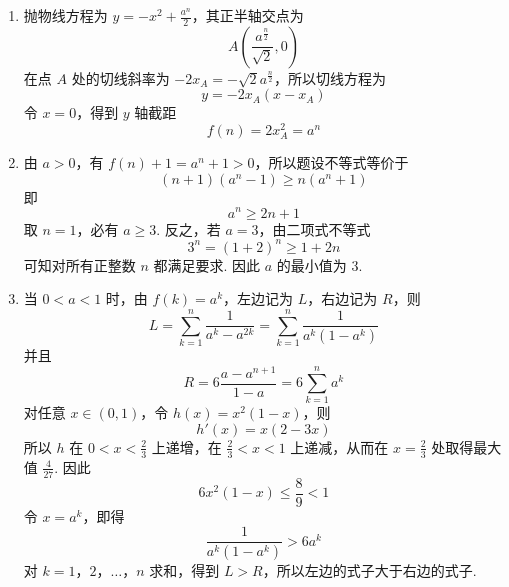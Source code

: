\begin{solution}
\begin{enumerate}
\item 抛物线方程为 \(y=-x^2+\frac{a^n}{2}\)，其正半轴交点为
\[
A\left(\frac{a^{\frac{n}{2}}}{\sqrt2},0\right)
\]
在点 \(A\) 处的切线斜率为 \(-2x_A=-\sqrt2a^{\frac{n}{2}}\)，所以切线方程为
\[
y=-2x_A(x-x_A)
\]
令 \(x=0\)，得到 \(y\) 轴截距
\[
f(n)=2x_A^2=a^n
\]
\item 由 \(a>0\)，有 \(f(n)+1=a^n+1>0\)，所以题设不等式等价于
\[
(n+1)(a^n-1)\geq n(a^n+1)
\]
即
\[
a^n\geq2n+1
\]
取 \(n=1\)，必有 \(a\geq3\). 反之，若 \(a=3\)，由二项式不等式
\[
3^n=(1+2)^n\geq1+2n
\]
可知对所有正整数 \(n\) 都满足要求. 因此 \(a\) 的最小值为 \(3\).
\item 当 \(0<a<1\) 时，由 \(f(k)=a^k\)，左边记为 \(L\)，右边记为 \(R\)，则
\[
L=\sum_{k=1}^{n}\frac1{a^k-a^{2k}}
=\sum_{k=1}^{n}\frac1{a^k(1-a^k)}
\]
并且
\[
R=6\frac{a-a^{n+1}}{1-a}=6\sum_{k=1}^{n}a^k
\]
对任意 \(x\in(0,1)\)，令 \(h(x)=x^2(1-x)\)，则
\[
h'(x)=x(2-3x)
\]
所以 \(h\) 在 \(0<x<\frac23\) 上递增，在 \(\frac23<x<1\) 上递减，从而在 \(x=\frac23\) 处取得最大值 \(\frac4{27}\). 因此
\[
6x^2(1-x)\leq\frac89<1
\]
令 \(x=a^k\)，即得
\[
\frac1{a^k(1-a^k)}>6a^k
\]
对 \(k=1\)，\(2\)，\(\ldots\)，\(n\) 求和，得到 \(L>R\)，所以左边的式子大于右边的式子.
\end{enumerate}
\end{solution}
